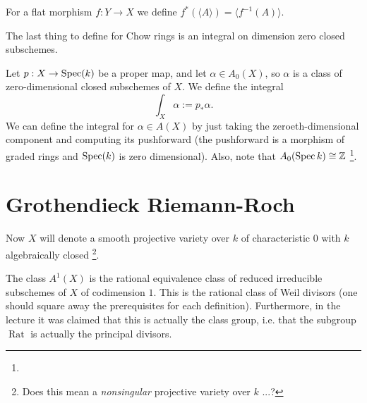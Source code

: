 \begin{definition}
	For a flat morphism $f: Y \to X$ we define $f^*(\langle A \rangle) = \langle f^{-1}(A) \rangle$.
\end{definition}

The last thing to define for Chow rings is an integral on dimension zero closed subschemes.

\begin{definition}
	Let $p: X \to \operatorname{Spec}(k)$ be a proper map, and let $\alpha \in A_0(X)$, so $\alpha$ is a class of zero-dimensional closed subschemes of $X$.
	We define the integral
	\[
    	\int_X \alpha := p_* \alpha.
    \] We can define the integral for $\alpha \in A(X)$ by just taking the zeroeth-dimensional component and computing its pushforward (the pushforward is a morphism of graded rings and $\operatorname{Spec}(k)$ is zero dimensional). Also, note that $A_0(\operatorname{Spec} k) \cong \mathbb{Z}$ \footnote{}. 
\end{definition}

\section{Grothendieck Riemann-Roch}

Now $X$ will denote a smooth projective variety over $k$ of characteristic $0$ with $k$ algebraically closed \footnote{Does this mean a \emph{nonsingular} projective variety over $k$ ...?}.

\begin{rmk}
	The class $A^1(X)$ is the rational equivalence class of reduced irreducible subschemes of $X$ of codimension $1$. This is the rational class of Weil divisors (one should square away the prerequisites for each definition). Furthermore, in the lecture it was claimed that this is actually the class group, i.e. that the subgroup $\operatorname{Rat}$ is actually the principal divisors.
\end{rmk}

